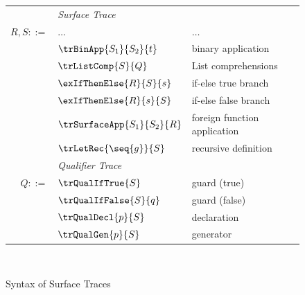 \begin{figure}
   \begin{minipage}[t]{0.52\textwidth}
      \begin{tabularx}{\textwidth}{rL{2.8cm}L{3.4cm}}
         &\textit{Surface Trace}&
         \\
         $R, S ::=$
         &
         $\dots$
         &
         $\dots$
         \\[2mm]
         &
         $\trBinApp{S_1}{S_2}{t}$  
         &
         binary application
         \\[2mm]
         &
         $\trListComp{S}{Q}$
         &
         List comprehensions
         \\[2mm]
         &
         $\exIfThenElse{R}{S}{s}$
         &
         if-else true branch
         \\[2mm]
         &
         $\exIfThenElse{R}{s}{S}$
         &
         if-else false branch
         \\[2mm]
         &
         $\trSurfaceApp{S_1}{S_2}{R}$
         &
         foreign function application
         \\[2mm]
         &
         $\trLetRec{\seq{g}}{S}$
         &
         recursive definition
         \\[2mm]
         &\textit{Qualifier Trace}&
         \\
         $Q ::=$
         &
         $\trQualIfTrue{S}$
         &
         guard (true)
         \\[2mm]
         &
         $\trQualIfFalse{S}{q}$
         &
         guard (false)
         \\[2mm]
         &
         $\trQualDecl{p}{S}$
         &
         declaration
         \\[2mm]
         &
         $\trQualGen{p}{S}$
         &
         generator
         \\[2mm]
      \end{tabularx}
   \end{minipage}%
   \\[2mm]
   \caption{Syntax of Surface Traces}
\end{figure}
    